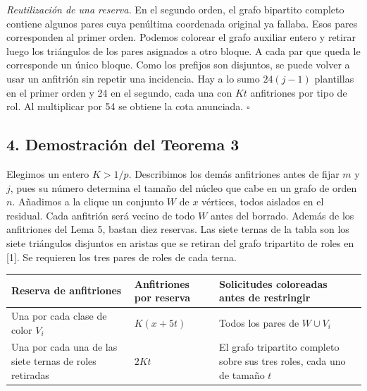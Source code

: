 \documentclass[spanish,11pt,a4paper]{article}
\newcounter{none}
\begin{document}
\emph{Reutilización de una reserva.} En el segundo orden, el grafo bipartito completo contiene algunos pares cuya penúltima coordenada original ya fallaba. Esos pares corresponden al primer orden. Podemos colorear el grafo auxiliar entero y retirar luego los triángulos de los pares asignados a otro bloque. A cada par que queda le corresponde un único bloque. Como los prefijos son disjuntos, se puede volver a usar un anfitrión sin repetir una incidencia. Hay a lo sumo \(24(j-1)\) plantillas en el primer orden y 24 en el segundo, cada una con \(Kt\) anfitriones por tipo de rol. Al multiplicar por 54 se obtiene la cota anunciada. \(\square\)

\subsection{4. Demostración del Teorema 3}\label{demostraciuxf3n-del-teorema-3}

Elegimos un entero \(K>1/p\). Describimos los demás anfitriones antes de fijar \(m\) y \(j\), pues su número determina el tamaño del núcleo que cabe en un grafo de orden \(n\). Añadimos a la clique un conjunto \(W\) de \(x\) vértices, todos aislados en el residual. Cada anfitrión será vecino de todo \(W\) antes del borrado. Además de los anfitriones del Lema 5, bastan diez reservas. Las siete ternas de la tabla son los siete triángulos disjuntos en aristas que se retiran del grafo tripartito de roles en {[}1{]}. Se requieren los tres pares de roles de cada terna.

{\def\LTcaptype{none} %
\begin{longtable}[]{@{}
  >{\raggedright\arraybackslash}p{}
  >{\raggedleft\arraybackslash}p{}
  >{\raggedright\arraybackslash}p{}@{}}
\toprule\noalign{}
\begin{minipage}[b]{\linewidth}\raggedright
Reserva de anfitriones
\end{minipage} & \begin{minipage}[b]{\linewidth}\raggedleft
Anfitriones por reserva
\end{minipage} & \begin{minipage}[b]{\linewidth}\raggedright
Solicitudes coloreadas antes de restringir
\end{minipage} \\
\midrule\noalign{}
\endhead
\bottomrule\noalign{}
\endlastfoot
Una por cada clase de color \(V_i\) & \(K(x+5t)\) & Todos los pares de \(W\cup V_i\) \\
Una por cada una de las siete ternas de roles retiradas & \(2Kt\) & El grafo tripartito completo sobre sus tres roles, cada uno de tamaño \(t\) \\
\end{longtable}
}
\end{document}
